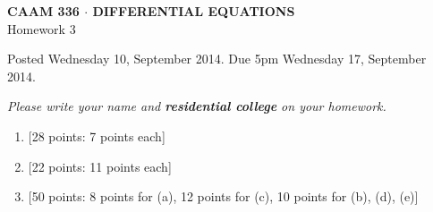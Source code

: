 \documentclass[10pt]{article}
\begin{document}
\newcommand{\pd}[3]{\frac{\partial^{#3} #1}{\partial #2^{#3}}}

\vspace*{-5em}
\begin{center}
\large \textsf{\textbf{CAAM 336 $\cdot$ DIFFERENTIAL EQUATIONS}\\[0.5em]
Homework 3 }
\end{center}

Posted Wednesday 10, September 2014.  Due 5pm Wednesday 17, September 2014.

\begin{center}
\emph{Please write your name and \textbf{residential college} on your homework.}
\end{center}

\begin{enumerate}

\item {[28 points: 7 points each]}  
\newpage
\item {[22 points: 11 points each]}  
\newpage
\item {[50 points: 8 points for (a), 12 points for (c), 10 points for (b), (d), (e)]}  

\end{enumerate}
\end{document}
